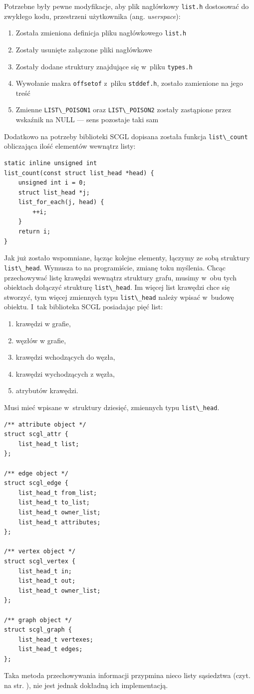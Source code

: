 \documentclass[a4paper,12pt,polish,oneside,openright]{thesis}
\newcommand\code[1]{\lstinline[style=line]{#1}}
\begin{document}
Potrzebne były pewne modyfikacje, aby plik nagłówkowy \code{list.h} dostosować do zwykłego kodu, przestrzeni użytkownika (ang. \emph{userspace}):
\begin{enumerate}
	\item Została zmieniona definicja pliku nagłówkowego \code{list.h}
	\item Zostały usunięte załączone pliki nagłówkowe
	\item Zostały dodane struktury znajdujące się w~pliku \code{types.h}
	\item Wywołanie makra \code{offsetof} z~pliku \code{stddef.h}, zostało zamienione na jego treść
	\item Zmienne \code{LIST\_POISON1} oraz \code{LIST\_POISON2} zostały zastąpione przez wskaźnik na NULL --- sens pozostaje taki sam
\end{enumerate}
Dodatkowo na potrzeby biblioteki SCGL dopisana została funkcja \code{list\_count} obliczająca ilość elementów wewnątrz listy:
\begin{lstlisting}[style=code,caption=Ciało funkcji {list\_count}]
static inline unsigned int
list_count(const struct list_head *head) {
	unsigned int i = 0;
	struct list_head *j;
	list_for_each(j, head) {
		++i;
	}
	return i;
}
\end{lstlisting}

Jak już zostało wspomniane, łącząc kolejne elementy, łączymy ze sobą struktury \code{list\_head}.
Wymusza to na programiście, zmianę toku myślenia.
Chcąc przechowywać listę krawędzi wewnątrz struktury grafu, musimy w~obu tych obiektach dołączyć strukturę \code{list\_head}.
Im więcej list krawędzi chce się stworzyć, tym więcej zmiennych typu \code{list\_head} należy wpisać w~budowę obiektu.
I~tak biblioteka SCGL posiadając pięć list:
\begin{enumerate}
	\item krawędzi w grafie,
	\item węzłów w grafie,
	\item krawędzi wchodzących do węzła,
	\item krawędzi wychodzących z węzła,
	\item atrybutów krawędzi.
\end{enumerate}
Musi mieć wpisane w~struktury dziesięć, zmiennych typu \code{list\_head}.

\begin{lstlisting}[style=code,caption=Zastosowanie Linux Kernel List na przykładzie struktur biblioteki SCGL]
/** attribute object */
struct scgl_attr {
	list_head_t list;
};

/** edge object */
struct scgl_edge {
	list_head_t from_list;
	list_head_t to_list;
	list_head_t owner_list;
	list_head_t attributes;
};

/** vertex object */
struct scgl_vertex {
	list_head_t in;
	list_head_t out;
	list_head_t owner_list;
};

/** graph object */
struct scgl_graph {
	list_head_t vertexes;
	list_head_t edges;
};
\end{lstlisting}
Taka metoda przechowywania informacji przypmina nieco listy sąsiedztwa (czyt. na str. \pageref{neigh_list}), nie jest jednak dokładną ich implementacją.
\end{document}
